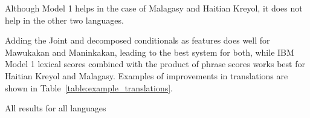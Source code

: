 \documentclass[11pt]{article}
\begin{document}
	Although Model 1 helps in the case of Malagasy and Haitian Kreyol, it does not help in the other two languages. 

	Adding the Joint and decomposed conditionals as features does well for Mawukakan and Maninkakan, leading to the best system for both, while IBM Model 1 lexical scores combined with the product of phrase scores works best for Haitian Kreyol and Malagasy. Examples of improvements in translations are shown in Table~\ref{table:example_translations}. 

		\begin{table}
			\small
			\centering
			
			\caption{All results for all languages}
			\label{table:all_results}
		\end{table}

\end{document}
